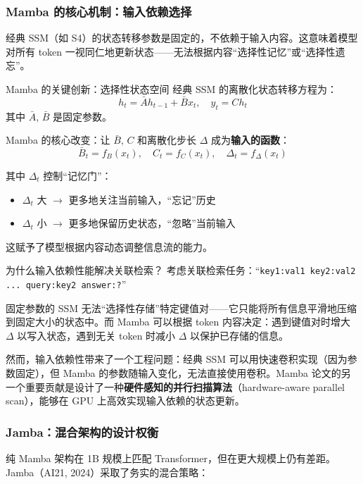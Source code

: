 \documentclass[a4paper]{article}
\begin{document}
\subsubsection{Mamba 的核心机制：输入依赖选择}

经典 SSM（如 S4）的状态转移参数是固定的，不依赖于输入内容。这意味着模型对所有 token 一视同仁地更新状态——无法根据内容``选择性记忆''或``选择性遗忘''。

\begin{importantbox}{Mamba 的关键创新：选择性状态空间}
经典 SSM 的离散化状态转移方程为：
$$h_t = \bar{A} h_{t-1} + \bar{B} x_t, \quad y_t = C h_t$$
其中 $\bar{A}$, $\bar{B}$ 是固定参数。

Mamba 的核心改变：让 $\bar{B}$, $C$ 和离散化步长 $\Delta$ 成为\textbf{输入的函数}：
$$\bar{B}_t = f_B(x_t), \quad C_t = f_C(x_t), \quad \Delta_t = f_\Delta(x_t)$$

其中 $\Delta_t$ 控制``记忆门''：
\begin{itemize}
    \item $\Delta_t$ 大 $\rightarrow$ 更多地关注当前输入，``忘记''历史
    \item $\Delta_t$ 小 $\rightarrow$ 更多地保留历史状态，``忽略''当前输入
\end{itemize}
这赋予了模型根据内容动态调整信息流的能力。
\end{importantbox}

\begin{knowledgebox}{为什么输入依赖性能解决关联检索？}
考虑关联检索任务：``\texttt{key1:val1 key2:val2 ... query:key2 answer:?}''

固定参数的 SSM 无法``选择性存储''特定键值对——它只能将所有信息平滑地压缩到固定大小的状态中。而 Mamba 可以根据 token 内容决定：遇到键值对时增大 $\Delta$ 以写入状态，遇到无关 token 时减小 $\Delta$ 以保护已存储的信息。
\end{knowledgebox}

然而，输入依赖性带来了一个工程问题：经典 SSM 可以用快速卷积实现（因为参数固定），但 Mamba 的参数随输入变化，无法直接使用卷积。Mamba 论文的另一个重要贡献是设计了一种\textbf{硬件感知的并行扫描算法}（hardware-aware parallel scan），能够在 GPU 上高效实现输入依赖的状态更新。

\subsubsection{Jamba：混合架构的设计权衡}

纯 Mamba 架构在 1B 规模上匹配 Transformer，但在更大规模上仍有差距。Jamba（AI21, 2024）采取了务实的混合策略：
\end{document}
